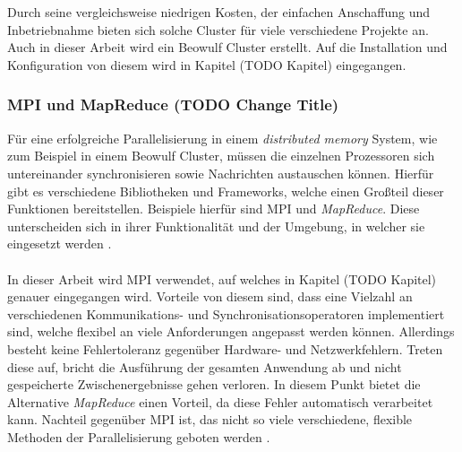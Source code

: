 \\\\
Durch seine vergleichsweise niedrigen Kosten, der einfachen Anschaffung und Inbetriebnahme bieten sich solche Cluster für viele verschiedene Projekte an. Auch in dieser Arbeit wird ein Beowulf Cluster erstellt. Auf die Installation und Konfiguration von diesem wird in Kapitel (TODO Kapitel) eingegangen.

\subsubsection{MPI und MapReduce (TODO Change Title)}
Für eine erfolgreiche Parallelisierung in einem \emph{distributed memory} System, wie zum Beispiel in einem Beowulf Cluster, müssen die einzelnen Prozessoren sich untereinander synchronisieren sowie Nachrichten austauschen können. Hierfür gibt es verschiedene Bibliotheken und Frameworks, welche einen Großteil dieser Funktionen bereitstellen. Beispiele hierfür sind \ac{MPI} und \emph{MapReduce}. Diese unterscheiden sich in ihrer Funktionalität und der Umgebung, in welcher sie eingesetzt werden \cite{nielsen2016introduction}.
\\\\
In dieser Arbeit wird \ac{MPI} verwendet, auf welches in Kapitel (TODO Kapitel) genauer eingegangen wird. Vorteile von diesem sind, dass eine Vielzahl an verschiedenen Kommunikations- und Synchronisationsoperatoren implementiert sind, welche flexibel an viele Anforderungen angepasst werden können. Allerdings besteht keine Fehlertoleranz gegenüber Hardware- und Netzwerkfehlern. Treten diese auf, bricht die Ausführung der gesamten Anwendung ab und nicht gespeicherte Zwischenergebnisse gehen verloren. In diesem Punkt bietet die Alternative \emph{MapReduce} einen Vorteil, da diese Fehler automatisch verarbeitet kann. Nachteil gegenüber \ac{MPI} ist, das nicht so viele verschiedene, flexible Methoden der Parallelisierung geboten werden \cite{nielsen2016introduction}.

